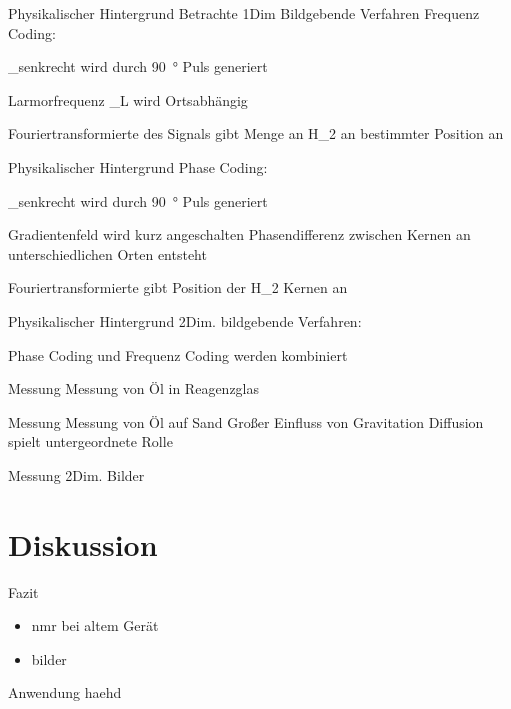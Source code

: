 \begin{frame}{Physikalischer Hintergrund}
Betrachte 1Dim Bildgebende Verfahren
Frequenz Coding:
	\item \M_{senkrecht} wird durch \SI{90}{\degree} Puls generiert
	\item Larmorfrequenz \omega_{L} wird Ortsabhängig
	\item Fouriertransformierte des Signals gibt Menge an H_{2} an bestimmter Position an
\end{frame}

\begin{frame}{Physikalischer Hintergrund}
Phase Coding:
	\item \M_{senkrecht} wird durch \SI{90}{\degree} Puls generiert
	\item Gradientenfeld wird kurz angeschalten
	\rightarrow Phasendifferenz zwischen Kernen an unterschiedlichen Orten entsteht
	\item Fouriertransformierte gibt Position der H_{2} Kernen an
\end{frame}

\begin{frame}{Physikalischer Hintergrund}
2Dim. bildgebende Verfahren:
	\item Phase Coding und Frequenz Coding werden kombiniert
\end{frame}

\begin{frame}{Messung}
Messung von Öl in Reagenzglas
\end{frame}

\begin{frame}{Messung}
Messung von Öl auf Sand
	\rightarrow Großer Einfluss von Gravitation
	\rightarrow Diffusion spielt untergeordnete Rolle
\end{frame}

\begin{frame}{Messung}
2Dim. Bilder
\end{frame}


\section{Diskussion}
\begin{frame}{Fazit}
	\begin{exampleblock}
	\begin{itemize}
	\item nmr bei altem Gerät
	\item bilder
	\end{itemize}
	\end{exampleblock}
\end{frame}

\begin{frame}{Anwendung}
haehd
\end{frame}